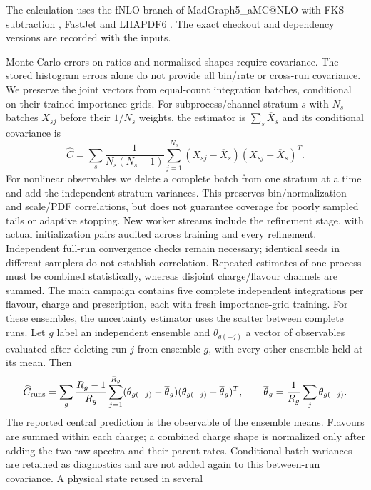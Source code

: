 \documentclass[11pt,a4paper]{article}
\begin{document}
The calculation uses the fNLO branch of MadGraph5\_aMC@NLO
\cite{MG5} with FKS subtraction \cite{FKS}, FastJet \cite{FastJet}
and LHAPDF6 \cite{LHAPDF6}. The exact checkout and dependency versions
are recorded with the inputs.

Monte Carlo errors on ratios and normalized shapes require covariance.
The stored histogram errors alone do not provide all bin/rate or
cross-run covariance. We preserve the joint vectors from equal-count
integration batches, conditional on their trained importance grids.
For subprocess/channel stratum $s$ with $N_s$ batches $X_{sj}$ before
their $1/N_s$ weights, the estimator is $\sum_s\overline X_s$ and its
conditional covariance is
\begin{equation}
 \widehat C=\sum_s\frac{1}{N_s(N_s-1)}
 \sum_{j=1}^{N_s}(X_{sj}-\overline X_s)(X_{sj}-\overline X_s)^T.
\end{equation}
For nonlinear observables we delete a complete batch from one stratum
at a time and add the independent stratum variances. This preserves
bin/normalization and scale/PDF correlations, but does not guarantee
coverage for poorly sampled tails or adaptive stopping. New worker streams
include the refinement stage, with actual initialization pairs audited across
training and every refinement. Independent full-run convergence
checks remain necessary; identical seeds in different samplers do not
establish correlation. Repeated estimates of one process must be combined
statistically, whereas disjoint charge/flavour channels are summed.
The main campaign contains five complete independent integrations
per flavour, charge and prescription, each with fresh importance-grid
training. For these ensembles, the uncertainty estimator uses the scatter
between complete runs. Let $g$ label an independent ensemble and
$\theta_{g(-j)}$ a vector of observables evaluated after deleting run $j$
from ensemble $g$, with every other ensemble held at its mean. Then
\begin{equation}
 \widehat C_{\rm runs}=\sum_g\frac{R_g-1}{R_g}
 \sum_{j=1}^{R_g}
 (\theta_{g(-j)}-\overline\theta_g)
 (\theta_{g(-j)}-\overline\theta_g)^T,
 \qquad
 \overline\theta_g=\frac{1}{R_g}\sum_j\theta_{g(-j)}.
\end{equation}
The reported central prediction is the observable of the ensemble means.
Flavours are summed within each charge; a combined charge shape is
normalized only after adding the two raw spectra and their parent rates.
Conditional batch variances are retained as diagnostics and are not added
again to this between-run covariance. A physical state reused in several
\end{document}
